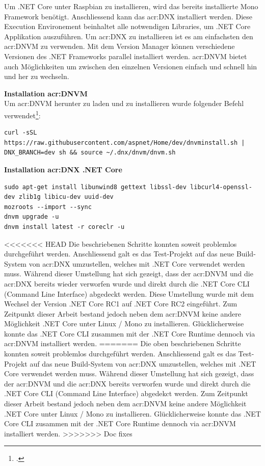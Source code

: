 Um .NET Core unter Raspbian zu installieren, wird das bereits installierte Mono Framework benötigt. Anschliessend kann das \gls{acr:DNX} installiert werden. Diese Execution Environement beinhaltet alle notwendigen Libraries, um .NET Core Applikation auszuführen. Um  \gls{acr:DNX} zu installieren ist es am einfachsten den \gls{acr:DNVM} zu verwenden. Mit dem Version Manager können verschiedene Versionen des .NET Frameworks parallel installiert werden. \gls{acr:DNVM} bietet auch Möglichkeiten um zwischen den einzelnen Versionen einfach und schnell hin und her zu wechseln.

\textbf{Installation \gls{acr:DNVM}} \\

Um \gls{acr:DNVM} herunter zu laden und zu installieren wurde folgender Befehl verwendet\footcite{Installing_ASPNET_5_2016-06-19}: 

\begin{lstlisting}
curl -sSL https://raw.githubusercontent.com/aspnet/Home/dev/dnvminstall.sh | DNX_BRANCH=dev sh && source ~/.dnx/dnvm/dnvm.sh
\end{lstlisting}


\textbf{Installation  \gls{acr:DNX} .NET Core} \\
\begin{lstlisting}
sudo apt-get install libunwind8 gettext libssl-dev libcurl4-openssl-dev zlib1g libicu-dev uuid-dev
mozroots --import --sync
dnvm upgrade -u
dnvm install latest -r coreclr -u
\end{lstlisting}

<<<<<<< HEAD
Die beschriebenen Schritte konnten soweit problemlos durchgeführt werden. Anschliessend galt es das Test-Projekt auf das neue Build-System von  \gls{acr:DNX} umzustellen, welches mit .NET Core verwendet werden muss. Während dieser Umstellung hat sich gezeigt, dass der \gls{acr:DNVM} und die  \gls{acr:DNX} bereits wieder verworfen wurde und direkt durch die .NET Core CLI (Command Line Interface) abgedeckt werden\footnotemark[1]. Diese Umstellung wurde mit dem Wechsel der Version .NET Core RC1 auf .NET Core RC2 eingeführt. Zum Zeitpunkt dieser Arbeit bestand jedoch neben dem \gls{acr:DNVM} keine andere Möglichkeit .NET Core unter Linux / Mono zu installieren. Glücklicherweise konnte das .NET Core CLI zusammen mit der .NET Core Runtime dennoch via \gls{acr:DNVM} installiert werden.
=======
Die oben beschriebenen Schritte konnten soweit problemlos durchgeführt werden. Anschliessend galt es das Test-Projekt auf das neue Build-System von  \gls{acr:DNX} umzustellen, welches mit .NET Core verwendet werden muss. Während dieser Umstellung hat sich gezeigt, dass der \gls{acr:DNVM} und die  \gls{acr:DNX} bereits verworfen wurde und direkt durch die .NET Core CLI (Command Line Interface) abgedekct werden\footnotemark[1]. Zum Zeitpunkt dieser Arbeit bestand jedoch neben dem \gls{acr:DNVM} keine andere Möglichkeit .NET Core unter Linux / Mono zu installieren. Glücklicherweise konnte das .NET Core CLI zusammen mit der .NET Core Runtime dennoch via \gls{acr:DNVM} installiert werden.
>>>>>>> Doc fixes

